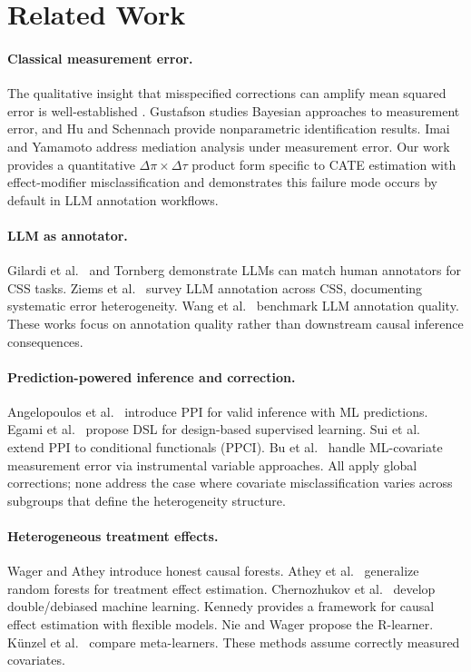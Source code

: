 \documentclass[11pt,twocolumn]{article}
\begin{document}
\section{Related Work}

\paragraph{Classical measurement error.}
The qualitative insight that misspecified corrections can amplify mean squared error is well-established \cite{fuller1987,carroll2006}. Gustafson \cite{gustafson2003} studies Bayesian approaches to measurement error, and Hu and Schennach \cite{hu2008} provide nonparametric identification results. Imai and Yamamoto \cite{imai2010} address mediation analysis under measurement error. Our work provides a quantitative $\Delta\pi \times \Delta\tau$ product form specific to CATE estimation with effect-modifier misclassification and demonstrates this failure mode occurs by default in LLM annotation workflows.

\paragraph{LLM as annotator.}
Gilardi et al.\ \cite{gilardi2023} and Tornberg \cite{tornberg2024} demonstrate LLMs can match human annotators for CSS tasks. Ziems et al.\ \cite{ziems2024} survey LLM annotation across CSS, documenting systematic error heterogeneity. Wang et al.\ \cite{wang2023} benchmark LLM annotation quality. These works focus on annotation quality rather than downstream causal inference consequences.

\paragraph{Prediction-powered inference and correction.}
Angelopoulos et al.\ \cite{angelopoulos2023} introduce PPI for valid inference with ML predictions. Egami et al.\ \cite{egami2024} propose DSL for design-based supervised learning. Sui et al.\ \cite{sui2026} extend PPI to conditional functionals (PPCI). Bu et al.\ \cite{bu2023} handle ML-covariate measurement error via instrumental variable approaches. All apply global corrections; none address the case where covariate misclassification varies across subgroups that define the heterogeneity structure.

\paragraph{Heterogeneous treatment effects.}
Wager and Athey \cite{wager2018} introduce honest causal forests. Athey et al.\ \cite{athey2019} generalize random forests for treatment effect estimation. Chernozhukov et al.\ \cite{chernozhukov2018} develop double/debiased machine learning. Kennedy \cite{kennedy2023} provides a framework for causal effect estimation with flexible models. Nie and Wager \cite{nie2021} propose the R-learner. K\"unzel et al.\ \cite{kunzel2019} compare meta-learners. These methods assume correctly measured covariates.
\end{document}
